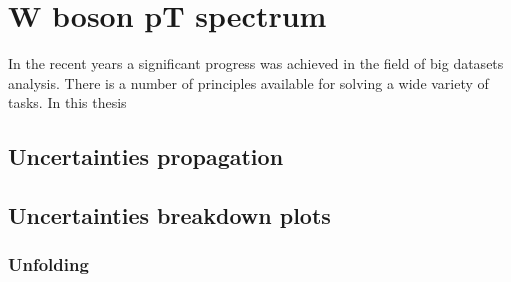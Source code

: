 \chapter{W boson pT spectrum}
	In the recent years a significant progress was achieved in the field of big datasets analysis. There is a number of principles available for solving a wide variety of tasks. In this thesis 


\section{Uncertainties propagation}
\section{Uncertainties breakdown plots}
\subsection{Unfolding}
